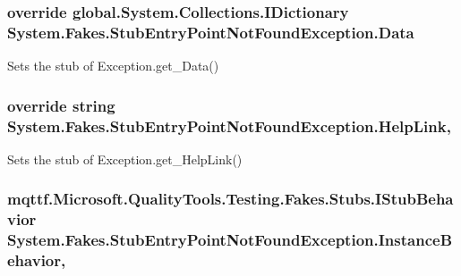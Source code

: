 \hypertarget{class_system_1_1_fakes_1_1_stub_entry_point_not_found_exception_a1dfb29c386a064d0ec6fd47504c1c5eb}{
\subsubsection[{Data}]{\setlength{\rightskip}{0pt plus 5cm}override global.\-System.\-Collections.\-I\-Dictionary System.\-Fakes.\-Stub\-Entry\-Point\-Not\-Found\-Exception.\-Data\hspace{0.3cm}{\ttfamily [get]}}}\label{class_system_1_1_fakes_1_1_stub_entry_point_not_found_exception_a1dfb29c386a064d0ec6fd47504c1c5eb}


Sets the stub of Exception.\-get\-\_\-\-Data()

\hypertarget{class_system_1_1_fakes_1_1_stub_entry_point_not_found_exception_a1f7108ac3cd4f91de3e6fa98fe612f52}{
\subsubsection[{Help\-Link}]{\setlength{\rightskip}{0pt plus 5cm}override string System.\-Fakes.\-Stub\-Entry\-Point\-Not\-Found\-Exception.\-Help\-Link\hspace{0.3cm}{\ttfamily [get]}, {\ttfamily [set]}}}\label{class_system_1_1_fakes_1_1_stub_entry_point_not_found_exception_a1f7108ac3cd4f91de3e6fa98fe612f52}


Sets the stub of Exception.\-get\-\_\-\-Help\-Link()

\hypertarget{class_system_1_1_fakes_1_1_stub_entry_point_not_found_exception_aecf2ce1183f095c1d3a2eccd1ff06c9f}{
\subsubsection[{Instance\-Behavior}]{\setlength{\rightskip}{0pt plus 5cm}mqttf.\-Microsoft.\-Quality\-Tools.\-Testing.\-Fakes.\-Stubs.\-I\-Stub\-Behavior System.\-Fakes.\-Stub\-Entry\-Point\-Not\-Found\-Exception.\-Instance\-Behavior\hspace{0.3cm}{\ttfamily [get]}, {\ttfamily [set]}}}\label{class_system_1_1_fakes_1_1_stub_entry_point_not_found_exception_aecf2ce1183f095c1d3a2eccd1ff06c9f}


